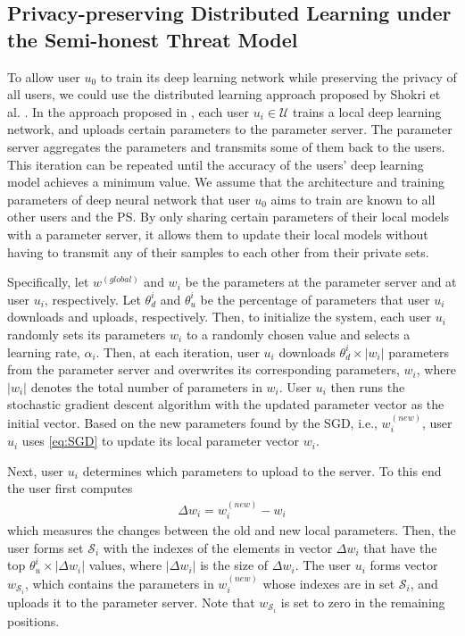 \documentclass[conference]{IEEEtran}
\begin{document}
\subsection{Privacy-preserving Distributed Learning under the Semi-honest Threat Model}
To allow user $u_0$ to train its deep learning network while preserving the privacy of all users, we could use the distributed
learning approach proposed by Shokri et al. \cite{shokri2015privacy}. 
In the approach proposed in \cite{shokri2015privacy}, each user $u_i\in\mathcal{U}$ trains a local deep learning
network, and uploads certain parameters to the parameter server. The parameter server aggregates the parameters and transmits some of
them back to the users. This iteration can be repeated until the accuracy of the users' deep learning model achieves a minimum value. 
We assume that the architecture and training parameters of  deep neural network that user $u_0$ aims to
train are known  to all other users and the PS.
By only sharing certain parameters of their local models
with a parameter server, it allows them to update their local models without having to transmit any of their samples to each other
from their private sets. 

Specifically, let  $w^{(global)}$ and $w_i$ be the parameters at the parameter server and at user $u_i$, respectively. Let 
$\theta_d^{i}$ and $\theta_u^{i}$ be the percentage of parameters that user $u_i$ downloads and uploads, respectively. Then, 
to initialize the system,  each user $u_i$ randomly sets its parameters $w_i$ to a randomly chosen value and selects a learning rate,
$\alpha_i$. Then, at each iteration,  user $u_i$  downloads $\theta_d^{i} \times |w_i|$ parameters from the parameter server and
overwrites its corresponding parameters, $w_i$, where $|w_i|$ denotes the total number of parameters in $w_i$. User $u_i$ then runs the
stochastic gradient descent algorithm 
with the updated parameter vector as the initial vector. 
Based on the new parameters found by the SGD, i.e., $w_i^{(new)}$, user $u_i$ uses \eqref{eq:SGD} to update its local parameter vector $w_i$. 

Next, user $u_i$ determines which parameters to upload to the server. 
To this end the user first computes 
\begin{align}\label{eq:deltaParam}
\Delta w_i =  w_i^{(new)} -  w_i
\end{align}
which measures the changes between the old and new
local parameters. Then, the user forms set $\mathcal{S}_i$ with the indexes of the elements in vector $\Delta w_i$ that have the top 
$\theta_u^{i} \times |\Delta w_i|$ values, where $|\Delta w_i|$ is the size of $\Delta w_i$. 
The user $u_i$ forms vector $w_{\mathcal{S}_i}$, which contains the parameters in $w_i^{(new)}$ whose indexes are in
set $\mathcal{S}_i$, and uploads it to the parameter server. Note that $w_{\mathcal{S}_i}$  is set to zero in the remaining
positions. 
\end{document}
